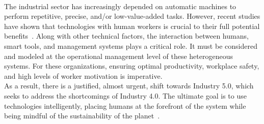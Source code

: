 \documentclass[review,12pt, 3p, times]{elsarticle}
\begin{document}
\\ 
The industrial sector has increasingly depended on automatic machines to perform repetitive, precise, and/or low-value-added tasks. However, recent studies have shown that  technologies with human workers is crucial to their full potential benefits~\citep{chen2022analysis,kose2023game,dolgui2022design}. Along with other technical factors, the interaction between humans, smart tools, and management systems plays a critical role. It must be considered and modeled at the operational management level of these heterogeneous systems. 
For these organizations, ensuring optimal productivity, workplace safety, and high levels of worker motivation is imperative.  
\\
As a result, there is a justified, almost urgent, shift towards Industry 5.0, which seeks to address the shortcomings of Industry 4.0. The ultimate goal is to use technologies intelligently, placing humans at the forefront of the system while being mindful of the sustainability of the planet~\cite {Destouet2023,battini2022towards}.  
\end{document}
